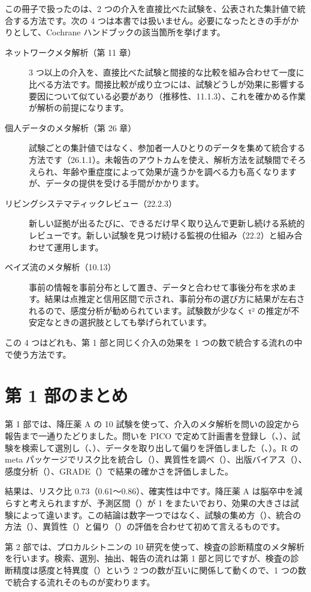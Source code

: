 この冊子で扱ったのは、2 つの介入を直接比べた試験を、公表された集計値で統合する方法です。次の 4 つは本書では扱いません。必要になったときの手がかりとして、Cochrane ハンドブックの該当箇所を挙げます。

\begin{description}
\item[ネットワークメタ解析（第 11 章）] 3 つ以上の介入を、直接比べた試験と間接的な比較を組み合わせて一度に比べる方法です。間接比較が成り立つには、試験どうしが効果に影響する要因について似ている必要があり（推移性、11.1.3）、これを確かめる作業が解析の前提になります。
\item[個人データのメタ解析（第 26 章）] 試験ごとの集計値ではなく、参加者一人ひとりのデータを集めて統合する方法です（26.1.1）。未報告のアウトカムを使え、解析方法を試験間でそろえられ、年齢や重症度によって効果が違うかを調べる力も高くなりますが、データの提供を受ける手間がかかります。
\item[リビングシステマティックレビュー（22.2.3）] 新しい証拠が出るたびに、できるだけ早く取り込んで更新し続ける系統的レビューです。新しい試験を見つけ続ける監視の仕組み（22.2）と組み合わせて運用します。
\item[ベイズ流のメタ解析（10.13）] 事前の情報を事前分布として置き、データと合わせて事後分布を求めます。結果は点推定と信用区間で示され、事前分布の選び方に結果が左右されるので、感度分析が勧められています。試験数が少なく τ² の推定が不安定なときの選択肢としても挙げられています。
\end{description}

この 4 つはどれも、第 1 部と同じく介入の効果を 1 つの数で統合する流れの中で使う方法です。

\section{第 1 部のまとめ}
\label{sec:08-7}

第 1 部では、降圧薬 A の 10 試験を使って、介入のメタ解析を問いの設定から報告まで一通りたどりました。問いを PICO で定めて計画書を登録し（、）、試験を検索して選別し（、）、データを取り出して偏りを評価しました（、）。R の meta パッケージでリスク比を統合し（）、異質性を調べ（）、出版バイアス（）、感度分析（）、GRADE（）で結果の確かさを評価しました。

結果は、リスク比 0.73（0.61〜0.86）、確実性は中です。降圧薬 A は脳卒中を減らすと考えられますが、予測区間（）が 1 をまたいでおり、効果の大きさは試験によって違います。この結論は数字一つではなく、試験の集め方（）、統合の方法（）、異質性（）と偏り（）の評価を合わせて初めて言えるものです。

第 2 部では、プロカルシトニンの 10 研究を使って、検査の診断精度のメタ解析を行います。検索、選別、抽出、報告の流れは第 1 部と同じですが、検査の診断精度は感度と特異度（）という 2 つの数が互いに関係して動くので、1 つの数で統合する流れそのものが変わります。
